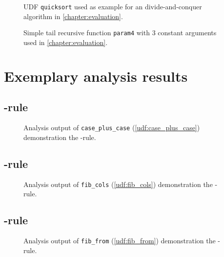 \begin{figure}[h!]
    \centering
    \caption{UDF \texttt{quicksort} used as example for an divide-and-conquer algorithm in \autoref{chapter:evaluation}.}
    \label{udf:fib_cte}
\end{figure}

\begin{figure}[h!]
    \centering
    
    \caption{Simple tail recursive function \texttt{param4} with 3 constant arguments used in \autoref{chapter:evaluation}.}
    \label{udf:param4}
\end{figure}

\FloatBarrier
{}
\section{Exemplary analysis results}
\subsection{{\normalfont\REXPR}-rule}

\begin{figure}[h!]
    \centering
    
    \caption{Analysis output of \texttt{case\_plus\_case} (\autoref{udf:case_plus_case}) demonstration the \REXPR-rule.}
    \label{scenarios:case_plus_case}
\end{figure}

\FloatBarrier
\newpage
\subsection{{\normalfont\RSELECT}-rule}

\begin{figure}[h!]
    \centering
    
    \caption{Analysis output of \texttt{fib\_cols} (\autoref{udf:fib_cols}) demonstration the \RSELECT-rule.}
    \label{scenarios:fib_cols}
\end{figure}
\restoregeometry

\FloatBarrier
\newpage
\subsection{{\normalfont\RFROM}-rule}

\begin{figure}[h!]
    \centering
    
    \caption{Analysis output of \texttt{fib\_from} (\autoref{udf:fib_from}) demonstration the \RFROM-rule.}
    \label{scenarios:fib_from}
\end{figure}
\FloatBarrier
\newpage
